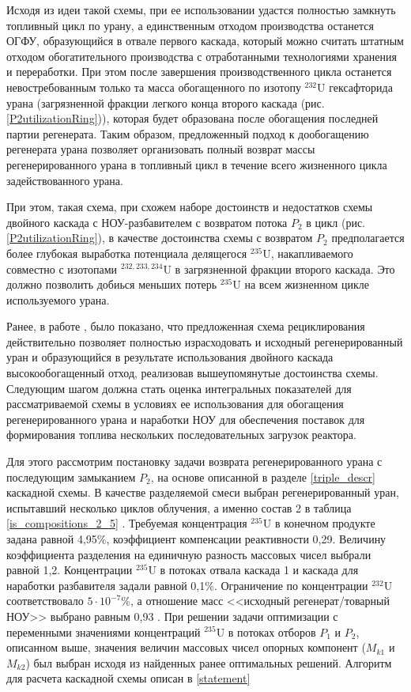 Исходя из идеи такой схемы, при ее использовании удастся полностью замкнуть топливный цикл по урану, а единственным отходом производства останется ОГФУ, образующийся в отвале первого каскада, который можно считать штатным отходом обогатительного производства с отработанными технологиями хранения и переработки. При этом после завершения производственного цикла останется невостребованным только та масса обогащенного по изотопу $^{232}$U гексафторида урана (загрязненной фракции легкого конца второго каскада (рис. \ref{P2utilizationRing})), которая будет образована после обогащения последней партии регенерата. Таким образом, предложенный подход к дообогащению регенерата урана позволяет организовать полный возврат массы регенерированного урана в топливный цикл в течение всего жизненного цикла задействованного урана.

При этом, такая схема, при схожем наборе достоинств и недостатков схемы двойного каскада с НОУ-разбавителем с возвратом потока $P_2$ в цикл (рис. \ref{P2utilizationRing}), в качестве достоинства схемы с возвратом $P_2$ предполагается более глубокая выработка потенциала делящегося $^{235}$U, накапливаемого совместно с изотопами $^{232,233,234}$U в загрязненной фракции второго каскада. Это должно позволить добиься меньших потерь $^{235}$U на всем жизненном цикле используемого урана.


Ранее, в работе \cite{nevinicaToplivnyyCiklLegkovodnogo2019}, было показано, что предложенная схема рециклирования действительно позволяет полностью израсходовать и исходный регенерированный уран и образующийся в результате использования двойного каскада высокообогащенный отход, реализовав вышеупомянутые достоинства схемы. Следующим шагом должна стать оценка интегральных показателей для рассматриваемой схемы в условиях ее использования для обогащения регенерированного урана и наработки НОУ для обеспечения поставок для формирования топлива нескольких последовательных загрузок реактора.

Для этого рассмотрим постановку задачи возврата регенерированного урана с последующим замыканием $P_2$, на основе описанной в разделе \ref{triple_descr} каскадной схемы. В качестве разделяемой смеси выбран регенерированный уран, испытавший несколько циклов облучения, а именно состав 2 в таблица \ref{is_compositions_2_5} \cite{smirnovObogashchenieRegenerirovannogoUrana2018}. Требуемая концентрация $^{235}$U в конечном продукте задана равной 4,95\%, коэффициент компенсации реактивности 0,29. Величину коэффициента разделения на единичную разность массовых чисел выбрали равной 1,2. Концентрации $^{235}$U в потоках отвала каскада 1 и каскада для наработки разбавителя задали равной 0,1\%. Ограничение по концентрации $^{232}$U соответствовало $5\cdot10^{-7} \%$, а отношение масс <<исходный регенерат/товарный НОУ>> выбрано равным 0,93 \cite{smirnovObogashchenieRegenerirovannogoUrana2018}.  При решении задачи оптимизации с переменными значениями концентраций $^{235}$U в потоках отборов $P_1$ и $P_2$, описанном выше, значения величин массовых чисел опорных компонент ($M_{k1}$ и $M_{k2}$) был выбран исходя из найденных ранее оптимальных решений. Алгоритм для расчета каскадной схемы описан в \ref{statement}

